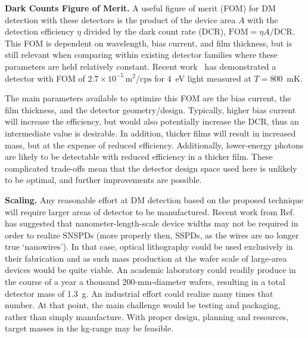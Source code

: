 \documentclass[twocolumn,10pt,prl,nofootinbib,preprintnumbers]{revtex4-1}
\def\mysection#1{{\bf #1.} }
\begin{document}
\mysection{Dark Counts Figure of Merit} A useful figure of merit
(FOM) for DM detection with these detectors is the product of the
device area $A$ with the detection efficiency $\eta$ divided by the
dark count rate (DCR), $\mathrm{FOM} = \eta A / \mathrm{DCR}$. This
FOM is dependent on wavelength, bias current, and film thickness, but is still relevant when comparing within existing detector families where these parameters are held relatively constant. Recent
work~\cite{Wollman2017} has demonstrated a detector with FOM of
$2.7\times 10^{-5}\,\mathrm{m}^2/\mathrm{cps}$ for \SI{4}{eV} light
measured at $T = 800$~mK.

The main parameters available to optimize this FOM are the bias
current, the film thickness, and the detector
geometry/design. Typically, higher bias current will increase the
efficiency, but would also potentially increase the DCR, thus an intermediate value
is desirable.  In addition, thicker films will result in increased
mass, but at the expense of reduced efficiency.  Additionally, lower-energy photons are likely to be detectable with reduced efficiency in a thicker film.
These complicated trade-offs mean that the detector design space used
here is unlikely to be optimal, and further improvements are possible.

\mysection{Scaling} Any reasonable effort at DM detection based on the
proposed technique will require larger areas of detector to be
manufactured. Recent work from Ref.~\cite{Korneeva2018} 
has suggested that nanometer-length-scale device widths may not be
required in order to realize SNSPDs (more properly then, SSPDs, as the
wires are no longer true `nanowires').  In that case, optical
lithography could be used exclusively in their fabrication and as such
mass production at the wafer scale of large-area devices would be
quite viable.  An academic laboratory could readily produce in the
course of a year a thousand 200-mm-diameter wafers, resulting in a
total detector mass of 1.3~g.  An industrial effort could realize many
times that number.  At that point, the main challenge would be testing
and packaging, rather than simply manufacture. With proper design,
planning and resources, target masses in the kg-range may be feasible.

{}
\end{document}
